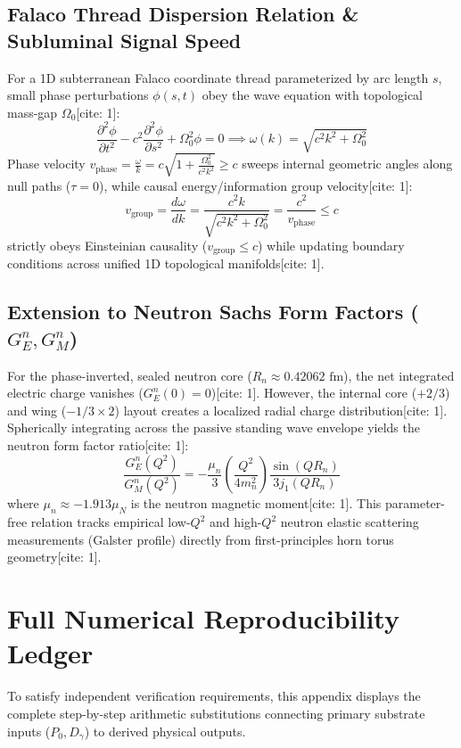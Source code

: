 \documentclass[11pt,a4paper]{article}
\begin{document}
	\subsection{Falaco Thread Dispersion Relation \& Subluminal Signal Speed}
	For a 1D subterranean Falaco coordinate thread parameterized by arc length $s$, small phase perturbations $\phi(s, t)$ obey the wave equation with topological mass-gap $\Omega_0$[cite: 1]:
	\begin{equation}
		\frac{\partial^2 \phi}{\partial t^2} - c^2 \frac{\partial^2 \phi}{\partial s^2} + \Omega_0^2 \phi = 0 \implies \omega(k) = \sqrt{c^2 k^2 + \Omega_0^2}
	\end{equation}
	Phase velocity $v_{\text{phase}} = \frac{\omega}{k} = c \sqrt{1 + \frac{\Omega_0^2}{c^2 k^2}} \ge c$ sweeps internal geometric angles along null paths ($\tau = 0$), while causal energy/information group velocity[cite: 1]:
	\begin{equation}
		v_{\text{group}} = \frac{d\omega}{dk} = \frac{c^2 k}{\sqrt{c^2 k^2 + \Omega_0^2}} = \frac{c^2}{v_{\text{phase}}} \le c
	\end{equation}
	strictly obeys Einsteinian causality ($v_{\text{group}} \le c$) while updating boundary conditions across unified 1D topological manifolds[cite: 1].
	
	\subsection{Extension to Neutron Sachs Form Factors ($G_E^n, G_M^n$)}
	For the phase-inverted, sealed neutron core ($R_n \approx 0.42062\text{ fm}$), the net integrated electric charge vanishes ($G_E^n(0) = 0$)[cite: 1]. However, the internal core ($+2/3$) and wing ($-1/3 \times 2$) layout creates a localized radial charge distribution[cite: 1]. Spherically integrating across the passive standing wave envelope yields the neutron form factor ratio[cite: 1]:
	\begin{equation}
		\frac{G_E^n(Q^2)}{G_M^n(Q^2)} = -\frac{\mu_n}{3} \left(\frac{Q^2}{4 m_n^2}\right) \frac{\sin(Q R_n)}{3 j_1(Q R_n)}
	\end{equation}
	where $\mu_n \approx -1.913 \mu_N$ is the neutron magnetic moment[cite: 1]. This parameter-free relation tracks empirical low-$Q^2$ and high-$Q^2$ neutron elastic scattering measurements (Galster profile) directly from first-principles horn torus geometry[cite: 1].
	
	\appendix
	\section{Full Numerical Reproducibility Ledger}
	To satisfy independent verification requirements, this appendix displays the complete step-by-step arithmetic substitutions connecting primary substrate inputs ($P_0, D_\gamma$) to derived physical outputs.
	
\end{document}
